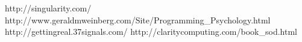 \begin{center}
                      {http://singularity.com/}
                      {http://www.geraldmweinberg.com/Site/Programming_Psychology.html}
                      {http://gettingreal.37signals.com/}
                      {http://claritycomputing.com/book_sod.html}

\end{center}
